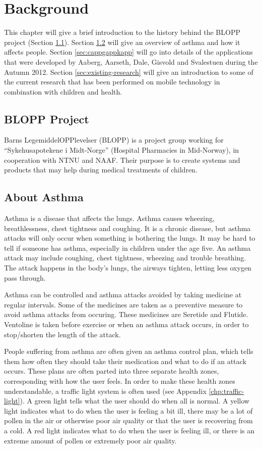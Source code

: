 \chapter{Background}
\label{chp:background}


This chapter will give a brief introduction to the history behind the BLOPP project (Section \ref{sec:bloppproject}). Section \ref{sec:about-asthma} will give an overview of asthma and how it affects people. Section \ref{sec:cappgappkapp} will go into details of the applications that were developed by Aaberg, Aarseth, Dale, Gisvold and Svalestuen during the Autumn 2012.     
Section \ref{sec:existing-research} will give an introduction to some of the current research that has been performed on mobile technology in combination with children and health.   


\section{BLOPP Project}
\label{sec:bloppproject}
Barns LegemiddelOPPlevelser (BLOPP) is a project group working for ``Sykehusapotekene i Midt-Norge'' (Hospital Pharmacies in Mid-Norway), in cooperation with NTNU and NAAF. Their purpose is to create systems and products that may help during medical treatments of children. 


\section{About Asthma}
\label{sec:about-asthma}
Asthma is a disease that affects the lungs. Asthma causes wheezing, breathlessness, chest tightness and coughing. It is a chronic disease, but asthma attacks will only occur when something is bothering the lungs. It may be hard to tell if someone has asthma, especially in children under the age five. 
An asthma attack may include coughing, chest tightness, wheezing and trouble breathing. The attack happens in the body's lungs, the airways tighten, letting less oxygen pass through.

Asthma can be controlled and asthma attacks avoided by taking medicine at regular intervals. Some of the medicines are taken as a preventive measure to avoid asthma attacks from occuring. These medicines are Seretide and Flutide. Ventoline is taken before exercise or when an asthma attack occurs, in order to stop/shorten the length of the attack. 

People suffering from asthma are often given an asthma control plan, which tells them how often they should take their medication and what to do if an attack occurs. These plans are often parted into three separate health zones, corresponding with how the user feels. In order to make these health zones understandable, a traffic light system is often used (see Appendix \ref{chp:traffic-light}). A green light tells what the user should do when all is normal. A yellow light indicates what to do when the user is feeling a bit ill, there may be a lot of pollen in the air or otherwise poor air quality or that the user is recovering from a cold. A red light indicates what to do when the user is feeling ill, or there is an extreme amount of pollen or extremely poor air quality.  


